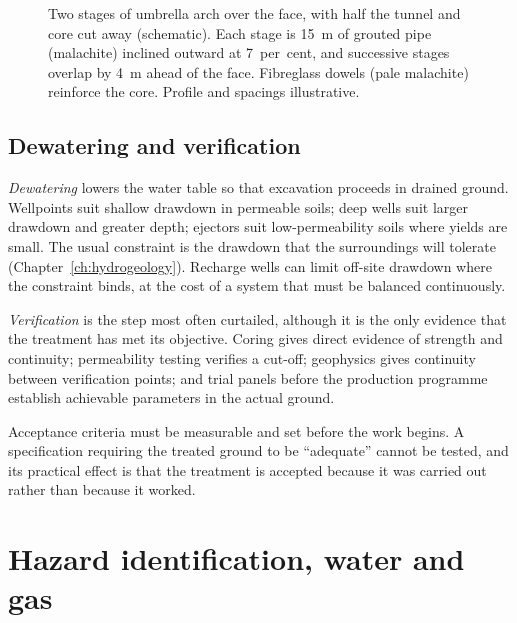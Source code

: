 \begin{figure}[htbp]
\centering
{}
\caption{Two stages of umbrella arch over the face, with half the tunnel and core cut away (schematic). Each stage is 15~m of grouted pipe (malachite) inclined outward at 7~per~cent, and successive stages overlap by 4~m ahead of the face. Fibreglass dowels (pale malachite) reinforce the core. Profile and spacings illustrative.}
\label{fig:r3d-umbrella-arch}
\end{figure}

\subsection{Dewatering and verification}
\label{sec:dewatering-verification}

\emph{Dewatering} lowers the water table so that excavation proceeds in
drained ground. Wellpoints suit shallow drawdown in permeable soils; deep
wells suit larger drawdown and greater depth; ejectors suit low-permeability
soils where yields are small. The usual constraint is the
drawdown that the surroundings will tolerate
(Chapter~\ref{ch:hydrogeology}). Recharge wells can limit off-site drawdown
where the constraint binds, at the cost of a system that must be balanced
continuously.

\emph{Verification} is the step most often curtailed, although it is the only
evidence that the treatment has met its objective. Coring gives direct evidence of
strength and continuity; permeability testing verifies a cut-off; geophysics
gives continuity between verification points; and trial panels before the
production programme establish achievable parameters in the actual ground.

Acceptance criteria must be measurable and set before the work begins. A
specification requiring the treated ground to be ``adequate'' cannot be tested,
and its practical effect is that the treatment is accepted because it was
carried out rather than because it worked.

\section{Hazard identification, water and gas}
\label{sec:water-gas-hazards}

